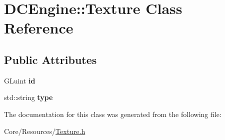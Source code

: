 \hypertarget{classDCEngine_1_1Texture}{\section{D\-C\-Engine\-:\-:Texture Class Reference}
\label{classDCEngine_1_1Texture}
}
\subsection*{Public Attributes}
\begin{DoxyCompactItemize}
\item 
\hypertarget{classDCEngine_1_1Texture_afeb4602292b17693db448177f2daf9ae}{G\-Luint {\bfseries id}}\label{classDCEngine_1_1Texture_afeb4602292b17693db448177f2daf9ae}

\item 
\hypertarget{classDCEngine_1_1Texture_ad4115b31dfcae12f43ed6282e886d94d}{std\-::string {\bfseries type}}\label{classDCEngine_1_1Texture_ad4115b31dfcae12f43ed6282e886d94d}

\end{DoxyCompactItemize}


The documentation for this class was generated from the following file\-:\begin{DoxyCompactItemize}
\item 
Core/\-Resources/\hyperlink{Texture_8h}{Texture.\-h}\end{DoxyCompactItemize}

